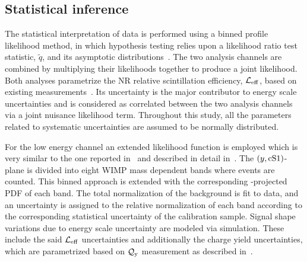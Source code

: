 
\subsection{Statistical inference}
\label{sec:LikelihoodFunction}
The statistical interpretation of data is performed using a binned profile likelihood method, in which hypothesis testing relies upon a likelihood ratio test statistic, $\tilde{q}$, 
and its asymptotic distributions~\cite{asympt}. The two analysis channels are combined by multiplying their likelihoods together to produce a joint likelihood. 
Both analyses parametrize the NR relative scintillation efficiency, $\mathcal{L}_{\mathrm{eff}}$, based on existing measurements~\cite{run8Result}. Its uncertainty is the major contributor to energy scale uncertainties and is considered as correlated between the two analysis channels via a joint nuisance likelihood term.
Throughout this study, all the parameters related to systematic uncertainties are assumed to be normally distributed.

For the low energy channel an extended likelihood function is employed which is very similar to the one reported in~\cite{Aprile:2011hx} and described in detail in~\cite{xe100_run_combination}. 
The $(y,\mathrm{cS1}{})$-plane is divided into eight WIMP mass dependent bands where events are counted. This binned approach is extended with the corresponding \cSi{}-projected PDF of each band. The total normalization of the background is fit to data, and an uncertainty is assigned to the relative normalization of each band according to the corresponding statistical uncertainty of the calibration sample.
Signal shape variations due to energy scale uncertainty are modeled via simulation. These include  the said $\mathcal{L}_{\mathrm{eff}}$ uncertainties and additionally 
the charge yield uncertainties, which are parametrized based on $\mathcal{Q}_{\mathrm{y}}$ measurement as described in~\cite{DataMCXenon}.

